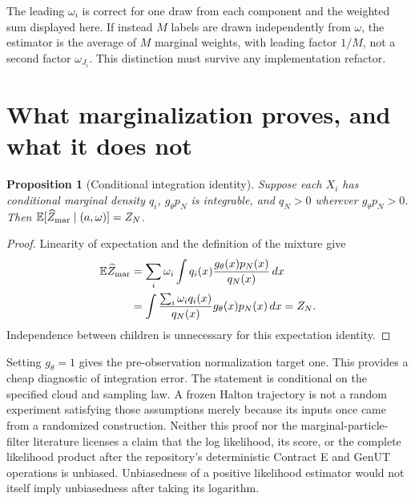 \documentclass[11pt]{article}
\newtheorem{proposition}{Proposition}
\newcommand{\E}{\mathbb E}
\begin{document}
The leading $\omega_i$ is correct for one draw from each component and the
weighted sum displayed here. If instead $M$ labels are drawn independently
from $\omega$, the estimator is the average of $M$ marginal weights, with
leading factor $1/M$, not a second factor $\omega_{J_i}$.
This distinction must survive any implementation refactor.

\section{What marginalization proves, and what it does not}

\begin{proposition}[Conditional integration identity]
\label{prop:integration}
Suppose each $X_i$ has conditional marginal density $q_i$, $g_\theta p_N$
is integrable, and $q_N>0$ wherever $g_\theta p_N>0$. Then
$\E[\widehat Z_{\rm mar}\mid (a,\omega)]=Z_N$.
\end{proposition}
\begin{proof}
Linearity of expectation and the definition of the mixture give
\begin{align}
 \E\widehat Z_{\rm mar}
 &=\sum_i\omega_i\int q_i(x)
                    \frac{g_\theta(x)p_N(x)}{q_N(x)}\,dx \notag\\
 &=\int\frac{\sum_i\omega_i q_i(x)}{q_N(x)}
                        g_\theta(x)p_N(x)\,dx
 =Z_N .
 \label{eq:integration-proof}
\end{align}
Independence between children is unnecessary for this expectation identity.
\end{proof}

Setting $g_\theta=1$ gives the pre-observation normalization target one.
This provides a cheap diagnostic of integration error. The statement is
conditional on the specified cloud and sampling law. A frozen Halton
trajectory is not a random experiment satisfying those assumptions merely
because its inputs once came from a randomized construction. Neither this
proof nor the marginal-particle-filter literature licenses a claim that the
log likelihood, its score, or the complete likelihood product after the
repository's deterministic Contract E and GenUT operations is unbiased.
Unbiasedness of a positive likelihood estimator would not itself imply
unbiasedness after taking its logarithm.
\end{document}
